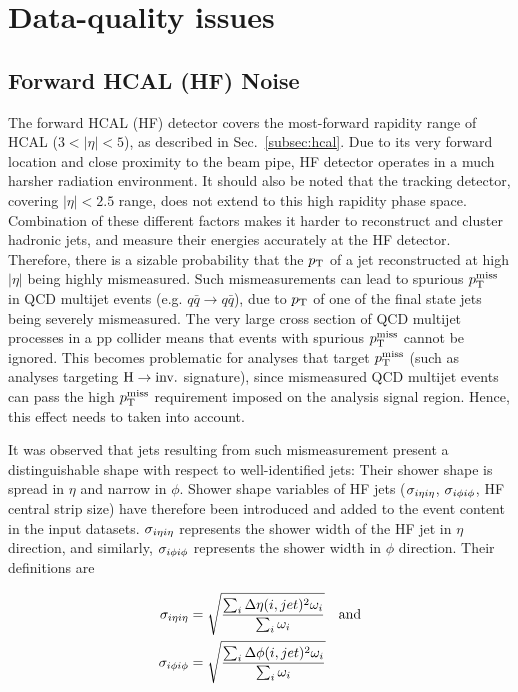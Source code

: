 \section{Data-quality issues}
\label{sec:dataquality}

\subsection{Forward HCAL (HF) Noise}
\label{subsec:hfnoise}

The forward HCAL (HF) detector covers the most-forward rapidity range of HCAL ($3 < |\eta| < 5$), as described in
Sec.~\ref{subsec:hcal}. Due to its very forward location and close proximity to the beam pipe, 
HF detector operates in a much harsher radiation environment. 
It should also be noted that the tracking detector, covering $|\eta| < 2.5$ range, does not extend to this high rapidity
phase space. Combination of these different factors makes it harder to reconstruct and cluster hadronic jets, 
and measure their energies accurately at the HF detector. Therefore, there
is a sizable probability that the $p_{\textrm{T}}$ of a jet reconstructed at high $|\eta|$ being highly mismeasured.
Such mismeasurements can lead to spurious $p_{\textrm{T}}^{\textrm{miss}}$ in QCD multijet events (e.g. $q\bar{q} \rightarrow q\bar{q}$),
due to $p_{\textrm{T}}$ of one of the final state jets being severely mismeasured. 
The very large cross section of QCD multijet processes in a pp collider
means that events with spurious $p_{\textrm{T}}^{\textrm{miss}}$ cannot be ignored.
This becomes problematic for analyses that target $p_{\textrm{T}}^{\textrm{miss}}$ (such as analyses targeting $\textrm{H} \rightarrow \textrm{inv.}$ signature), 
since mismeasured QCD multijet events can pass
the high $p_{\textrm{T}}^{\textrm{miss}}$ requirement imposed on the analysis signal region. Hence, this effect needs to taken into account. 

It was observed that jets resulting from such mismeasurement present a distinguishable shape with respect to well-identified jets: 
Their shower shape is spread in $\eta$ and narrow in $\phi$. Shower shape variables of HF jets ($\sigma_{i\eta i\eta}$, $\sigma_{i\phi i\phi}$, HF central strip size) 
have therefore been introduced and added to the event content in the input datasets. 
$\sigma_{i\eta i\eta}$ represents the shower width of the HF jet in $\eta$ direction, and similarly, $\sigma_{i\phi i\phi}$ represents the shower width in $\phi$ direction. 
Their definitions are

\begin{equation}
    \begin{split}
        \sigma_{i\eta i\eta} &= \sqrt{\frac{ \sum_{i} \Delta\eta(i, jet)^2 \omega_i }{ \sum_{i} \omega_i }} \quad \textrm{and} \\
        \sigma_{i\phi i\phi} &= \sqrt{\frac{ \sum_{i} \Delta\phi(i, jet)^2 \omega_i }{ \sum_{i} \omega_i }}
    \end{split}
    \label{eq:sieie_sipip}
\end{equation}

